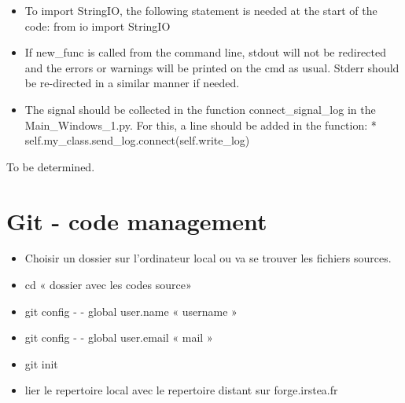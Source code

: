\documentclass[letterpaper,10pt,english]{sphinxmanual}
\begin{document}
\begin{itemize}
\begin{itemize}
\begin{itemize}
\begin{itemize}
\end{itemize}

\end{itemize}

\end{itemize}

\item {} 
To import StringIO, the following statement is needed at the start of the code: from io import StringIO

\item {} 
If new\_func is called from the command line, stdout will not be redirected and the errors or warnings will be printed on the cmd as usual.  Stderr should be re-directed in a similar manner if needed.

\item {} 
The signal should be collected in the function connect\_signal\_log in the Main\_Windows\_1.py.  For this, a line should be added in the function:
*       self.my\_class.send\_log.connect(self.write\_log)

\end{itemize}


To be determined.


\section{Git - code management}
\label{\detokenize{index:git-code-management}}
\begin{itemize}
\item {} 
Choisir un dossier sur l’ordinateur local ou va se trouver les fichiers sources.

\item {} 
cd  « dossier avec les codes source»

\item {} 
git config - - global user.name « username »

\item {} 
git config - - global user.email  « mail »

\item {} 
git init

\item {} 
lier le repertoire local avec le repertoire distant sur forge.irstea.fr

\end{itemize}
\end{document}

